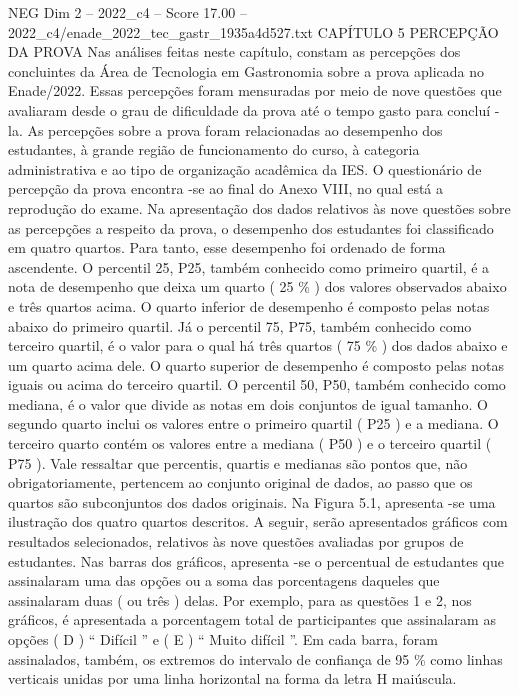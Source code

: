 \begin{textsample}{NEG Dim 2 – 2022\_c4 – Score 17.00 – 2022\_c4/enade\_2022\_tec\_gastr\_1935a4d527.txt}  \label{ex:f2_neg_405}
CAPÍTULO 5 PERCEPÇÃO DA PROVA Nas análises feitas neste capítulo, constam as percepções dos concluintes da Área de Tecnologia em Gastronomia sobre a prova aplicada no Enade/2022.
Essas percepções foram mensuradas por meio de nove questões que avaliaram desde o grau de dificuldade da prova até o tempo gasto para concluí -la.
As percepções sobre a prova foram relacionadas ao desempenho dos estudantes, à grande região de funcionamento do curso, à categoria administrativa e ao tipo de organização acadêmica da IES.
O questionário de percepção da prova encontra -se ao final do Anexo VIII, no qual está a reprodução do exame.
Na apresentação dos dados relativos às nove questões sobre as percepções a respeito da prova, o desempenho dos estudantes foi classificado em quatro quartos.
Para tanto, esse desempenho foi ordenado de forma ascendente.
O percentil 25, P25, também conhecido como primeiro quartil, é a nota de desempenho que deixa um quarto ( 25 \% ) dos valores observados abaixo e três quartos acima.
O quarto inferior de desempenho é composto pelas notas abaixo do primeiro quartil.
Já o percentil 75, P75, também conhecido como terceiro quartil, é o valor para o qual há três quartos ( 75 \% ) dos dados abaixo e um quarto acima dele.
O quarto superior de desempenho é composto pelas notas iguais ou acima do terceiro quartil.
O percentil 50, P50, também conhecido como mediana, é o valor que divide as notas em dois conjuntos de igual tamanho.
O segundo quarto inclui os valores entre o primeiro quartil ( P25 ) e a mediana.
O terceiro quarto contém os valores entre a mediana ( P50 ) e o terceiro quartil ( P75 ).
Vale ressaltar que percentis, quartis e medianas são pontos que, não obrigatoriamente, pertencem ao conjunto original de dados, ao passo que os quartos são subconjuntos dos dados originais.
Na Figura 5.1, apresenta -se uma ilustração dos quatro quartos descritos.
A seguir, serão apresentados gráficos com resultados selecionados, relativos às nove questões avaliadas por grupos de estudantes.
Nas barras dos gráficos, apresenta -se o percentual de estudantes que assinalaram uma das opções ou a soma das porcentagens daqueles que assinalaram duas ( ou três ) delas.
Por exemplo, para as questões 1 e 2, nos gráficos, é apresentada a porcentagem total de participantes que assinalaram as opções ( D ) “ Difícil ” e ( E ) “ Muito difícil ”.
Em cada barra, foram assinalados, também, os extremos do intervalo de confiança de 95 \% como linhas verticais unidas por uma linha horizontal na forma da letra H maiúscula.

\end{textsample}
